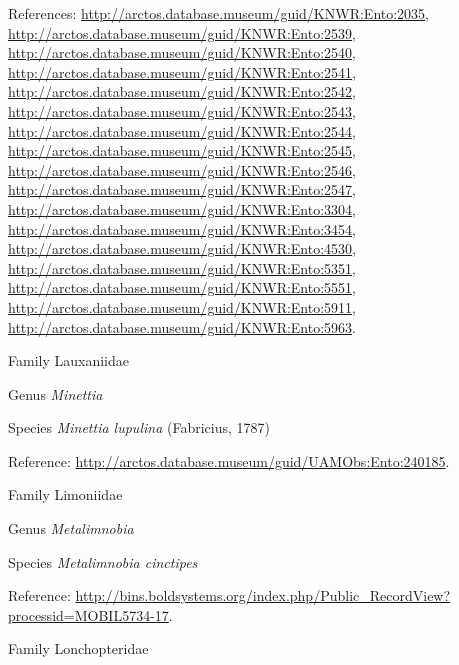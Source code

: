 \documentclass[9pt, article]{memoir}
\begin{document}
\begin{multicols}{2}
\vspace{6pt}References: 
\url{http://arctos.database.museum/guid/KNWR:Ento:2035}, 
\url{http://arctos.database.museum/guid/KNWR:Ento:2539}, 
\url{http://arctos.database.museum/guid/KNWR:Ento:2540}, 
\url{http://arctos.database.museum/guid/KNWR:Ento:2541}, 
\url{http://arctos.database.museum/guid/KNWR:Ento:2542}, 
\url{http://arctos.database.museum/guid/KNWR:Ento:2543}, 
\url{http://arctos.database.museum/guid/KNWR:Ento:2544}, 
\url{http://arctos.database.museum/guid/KNWR:Ento:2545}, 
\url{http://arctos.database.museum/guid/KNWR:Ento:2546}, 
\url{http://arctos.database.museum/guid/KNWR:Ento:2547}, 
\url{http://arctos.database.museum/guid/KNWR:Ento:3304}, 
\url{http://arctos.database.museum/guid/KNWR:Ento:3454}, 
\url{http://arctos.database.museum/guid/KNWR:Ento:4530}, 
\url{http://arctos.database.museum/guid/KNWR:Ento:5351}, 
\url{http://arctos.database.museum/guid/KNWR:Ento:5551}, 
\url{http://arctos.database.museum/guid/KNWR:Ento:5911}, 
\url{http://arctos.database.museum/guid/KNWR:Ento:5963}.

\vspace{6pt}\noindent\hspace{24pt}Family Lauxaniidae


\vspace{6pt}\noindent\hspace{30pt}Genus \textit{Minettia}


\vspace{6pt}\noindent\hspace{36pt}Species \textit{Minettia lupulina} (Fabricius, 1787)


\vspace{6pt}Reference: 
\url{http://arctos.database.museum/guid/UAMObs:Ento:240185}.

\vspace{6pt}\noindent\hspace{24pt}Family Limoniidae


\vspace{6pt}\noindent\hspace{30pt}Genus \textit{Metalimnobia}


\vspace{6pt}\noindent\hspace{36pt}Species \textit{Metalimnobia cinctipes}


\vspace{6pt}Reference: 
\url{http://bins.boldsystems.org/index.php/Public_RecordView?processid=MOBIL5734-17}.

\vspace{6pt}\noindent\hspace{24pt}Family Lonchopteridae



\end{multicols}
\end{document}
